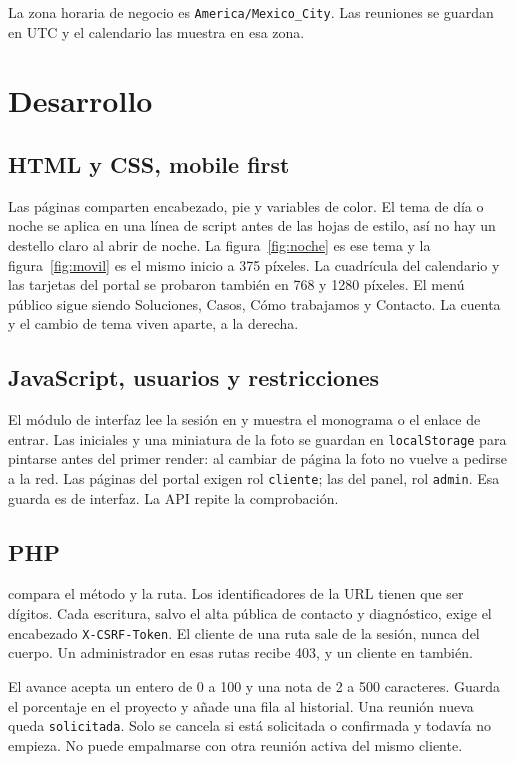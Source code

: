 La zona horaria de negocio es \texttt{America/Mexico\_City}. Las reuniones se
guardan en UTC y el calendario las muestra en esa zona.

\section{Desarrollo}

\subsection{HTML y CSS, mobile first}

Las páginas comparten encabezado, pie y variables de color. El tema de día o
noche se aplica en una línea de script antes de las hojas de estilo, así no
hay un destello claro al abrir de noche. La figura~\ref{fig:noche} es ese
tema y la figura~\ref{fig:movil} es el mismo inicio a 375 píxeles. La
cuadrícula del calendario y las tarjetas del portal se probaron también en
768 y 1280 píxeles. El menú público sigue siendo Soluciones, Casos, Cómo
trabajamos y Contacto. La cuenta y el cambio de tema viven aparte, a la
derecha.

\subsection{JavaScript, usuarios y restricciones}

El módulo de interfaz lee la sesión en  y muestra el
monograma o el enlace de entrar. Las iniciales y una miniatura de la foto se
guardan en \texttt{localStorage} para pintarse antes del primer render: al
cambiar de página la foto no vuelve a pedirse a la red. Las páginas del portal
exigen rol \texttt{cliente}; las del panel, rol \texttt{admin}. Esa guarda es
de interfaz. La API repite la comprobación.

\subsection{PHP}

 compara el método y la ruta. Los identificadores
de la URL tienen que ser dígitos. Cada escritura, salvo el alta pública de
contacto y diagnóstico, exige el encabezado \texttt{X-CSRF-Token}. El cliente
de una ruta  sale de la sesión, nunca del cuerpo. Un administrador
en esas rutas recibe 403, y un cliente en  también.

El avance acepta un entero de 0 a 100 y una nota de 2 a 500 caracteres. Guarda
el porcentaje en el proyecto y añade una fila al historial. Una reunión nueva
queda \texttt{solicitada}. Solo se cancela si está solicitada o confirmada y
todavía no empieza. No puede empalmarse con otra reunión activa del mismo
cliente.


